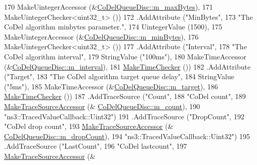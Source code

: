 \begin{DoxyCode}
170                    MakeUintegerAccessor (&\hyperlink{classns3_1_1CoDelQueueDisc_aaedc40bf84fcee585be0e9cf3c98f33d}{CoDelQueueDisc::m\_maxBytes}),
171                    MakeUintegerChecker<uint32\_t> ())
172     .AddAttribute (\textcolor{stringliteral}{"MinBytes"},
173                    \textcolor{stringliteral}{"The CoDel algorithm minbytes parameter."},
174                    UintegerValue (1500),
175                    MakeUintegerAccessor (&\hyperlink{classns3_1_1CoDelQueueDisc_a508ecc494f78426c539caa21c7109bc2}{CoDelQueueDisc::m\_minBytes}),
176                    MakeUintegerChecker<uint32\_t> ())
177     .AddAttribute (\textcolor{stringliteral}{"Interval"},
178                    \textcolor{stringliteral}{"The CoDel algorithm interval"},
179                    StringValue (\textcolor{stringliteral}{"100ms"}),
180                    MakeTimeAccessor (&\hyperlink{classns3_1_1CoDelQueueDisc_af347ae81576ce27b3f06d015f9422ec1}{CoDelQueueDisc::m\_interval}),
181                    \hyperlink{group__time_ga7032965bd4afa578691d88c09e4481c1}{MakeTimeChecker} ())
182     .AddAttribute (\textcolor{stringliteral}{"Target"},
183                    \textcolor{stringliteral}{"The CoDel algorithm target queue delay"},
184                    StringValue (\textcolor{stringliteral}{"5ms"}),
185                    MakeTimeAccessor (&\hyperlink{classns3_1_1CoDelQueueDisc_aa9cb41f0fc76d917b4648ac9da7e9ae3}{CoDelQueueDisc::m\_target}),
186                    \hyperlink{group__time_ga7032965bd4afa578691d88c09e4481c1}{MakeTimeChecker} ())
187     .AddTraceSource (\textcolor{stringliteral}{"Count"},
188                      \textcolor{stringliteral}{"CoDel count"},
189                      \hyperlink{group__tracing_gab21a770b9855af4e8f69f7531ea4a6b0}{MakeTraceSourceAccessor} (&
      \hyperlink{classns3_1_1CoDelQueueDisc_a87a17c1b3df276df0a43a4270ee6515c}{CoDelQueueDisc::m\_count}),
190                      \textcolor{stringliteral}{"ns3::TracedValueCallback::Uint32"})
191     .AddTraceSource (\textcolor{stringliteral}{"DropCount"},
192                      \textcolor{stringliteral}{"CoDel drop count"},
193                      \hyperlink{group__tracing_gab21a770b9855af4e8f69f7531ea4a6b0}{MakeTraceSourceAccessor} (&
      \hyperlink{classns3_1_1CoDelQueueDisc_ae61e9b4326d0f0b7db697c1e44e1336f}{CoDelQueueDisc::m\_dropCount}),
194                      \textcolor{stringliteral}{"ns3::TracedValueCallback::Uint32"})
195     .AddTraceSource (\textcolor{stringliteral}{"LastCount"},
196                      \textcolor{stringliteral}{"CoDel lastcount"},
197                      \hyperlink{group__tracing_gab21a770b9855af4e8f69f7531ea4a6b0}{MakeTraceSourceAccessor} (&

\end{DoxyCode}
